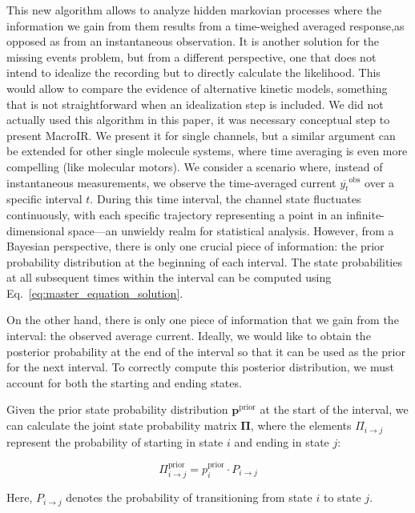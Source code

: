 \documentclass[pdflatex,sn-mathphys-num]{sn-jnl}%
\theoremstyle{thmstyleone}%
\theoremstyle{thmstyletwo}%
\theoremstyle{thmstylethree}%
\begin{document}
This new algorithm allows to analyze hidden markovian processes where the information we gain from them results from a time-weighed averaged response,as opposed as from an instantaneous observation. It is another solution for the missing events problem, but from a different perspective, one that does not intend to idealize the recording but to directly calculate the likelihood. This would allow to compare the evidence of alternative kinetic models, something that is not straightforward when an idealization step is included.  
We did not actually used this algorithm in this paper, it was necessary conceptual step to present MacroIR. We present it for single channels, but a similar argument can be extended for other single molecule systems, where time averaging is even more compelling (like molecular motors). 
We consider a scenario where, instead of instantaneous measurements, we observe the time-averaged current \( \overline{y_t}^{\text{obs}} \) over a specific interval \( t \). During this time interval, the channel state fluctuates continuously, with each specific trajectory representing a point in an infinite-dimensional space—an unwieldy realm for statistical analysis. However, from a Bayesian perspective, there is only one crucial piece of information: the prior probability distribution at the beginning of each interval. The state probabilities at all subsequent times within the interval can be computed using Eq.~\ref{eq:master_equation_solution}. 

On the other hand, there is only one piece of information that we gain from the interval: the observed average current. Ideally, we would like to obtain the posterior probability at the end of the interval so that it can be used as the prior for the next interval. To correctly compute this posterior distribution, we must account for both the starting and ending states.

Given the prior state probability distribution \( \boldsymbol{p}^{\text{prior}} \) at the start of the interval, we can calculate the joint state probability matrix \( \boldsymbol{\Pi} \), where the elements \( \Pi_{i \rightarrow j} \) represent the probability of starting in state \( i \) and ending in state \( j \):

\begin{equation}
	\Pi_{i \rightarrow j}^{\text{prior}} = p^{\text{prior}}_i \cdot P_{i \rightarrow j}
	\label{eq:joint_state_probability}
\end{equation}

Here, \( P_{i \rightarrow j} \) denotes the probability of transitioning from state \( i \) to state \( j \).
\end{document}
